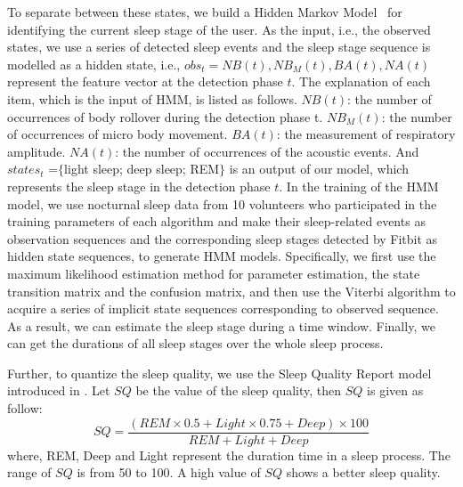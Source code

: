 To separate between these states, we build a Hidden Markov Model~\cite{johnson2010hidden} for identifying the current sleep stage of the user. As the input, i.e., the observed states, we use a series of detected sleep events and the sleep stage sequence is modelled as a hidden state, i.e., $obs_t={NB(t),NB_M(t),BA(t),NA(t)}$ represent the feature vector at the detection phase $t$. The explanation of each item, which is the input of HMM, is listed as follows. $NB(t)$: the number of occurrences of body rollover during the detection phase t. $NB_M(t)$: the number of occurrences of micro body movement. $BA(t)$: the measurement of respiratory amplitude.  $NA(t)$: the number of occurrences of the acoustic events. And $states_t$ =$\{$light sleep; deep sleep; REM$\}$ is an output of our model, which represents the sleep stage in the detection phase $t$. In the training of the HMM model, we use nocturnal sleep data from 10 volunteers who participated in the training parameters of each algorithm and make their sleep-related events as observation sequences and the corresponding sleep stages detected by Fitbit as hidden state sequences, to generate HMM models. Specifically, we first use the maximum likelihood estimation method for parameter estimation, the state transition matrix and the confusion matrix, and then use the Viterbi algorithm to acquire a series of implicit state sequences corresponding to observed sequence.  As a result, we can estimate the sleep stage during a time window. Finally, we can get the durations of all sleep stages over the whole sleep process.

Further, to quantize the sleep quality, we use the Sleep Quality Report model introduced in \cite{gu2016sleep}. Let $SQ$ be the value of the sleep quality, then $SQ$ is given as follow:
 \begin{equation}
SQ=\frac{(REM \times 0.5+Light \times 0.75+Deep) \times 100}{REM+Light+Deep}
 \end{equation}
where, REM, Deep and Light represent the duration time in a sleep process. The range of $SQ$ is from 50 to 100. A high value of $SQ$ shows a better  sleep quality.
